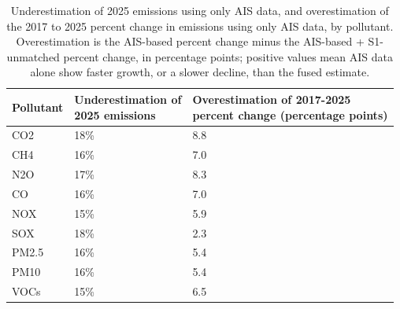 \begin{table}[!h]
\centering
\caption{\label{tab:pollutant_ais_underestimation_overestimation_summary}Underestimation of 2025 emissions using only AIS data, and overestimation of the 2017 to 2025 percent change in emissions using only AIS data, by pollutant. Overestimation is the AIS-based percent change minus the AIS-based + S1-unmatched percent change, in percentage points; positive values mean AIS data alone show faster growth, or a slower decline, than the fused estimate.}
\centering
\fontsize{8}{10}\selectfont
\begin{tabular}[t]{l|l|l}
\hline
Pollutant & \shortstack{Underestimation of\\2025 emissions} & \shortstack{Overestimation of 2017-2025\\percent change (percentage points)}\\
\hline
CO2 & 18\% & 8.8\\
\hline
CH4 & 16\% & 7.0\\
\hline
N2O & 17\% & 8.3\\
\hline
CO & 16\% & 7.0\\
\hline
NOX & 15\% & 5.9\\
\hline
SOX & 18\% & 2.3\\
\hline
PM2.5 & 16\% & 5.4\\
\hline
PM10 & 16\% & 5.4\\
\hline
VOCs & 15\% & 6.5\\
\hline
\end{tabular}
\end{table}
